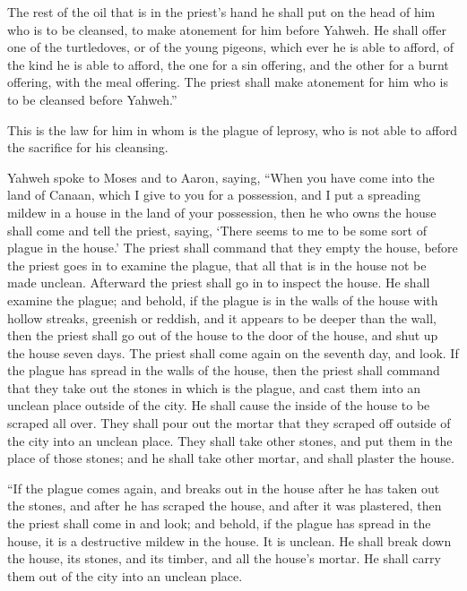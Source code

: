 {The rest of the oil that is in the priest’s hand he shall put on the head of him who is to be cleansed, to make atonement for him before Yahweh.
He shall offer one of the turtledoves, or of the young pigeons, which ever he is able to afford,
of the kind he is able to afford, the one for a sin offering, and the other for a burnt offering, with the meal offering. The priest shall make atonement for him who is to be cleansed before Yahweh.”
\par }{\PP {}This is the law for him in whom is the plague of leprosy, who is not able to afford the sacrifice for his cleansing.
\par }{\PP {}Yahweh spoke to Moses and to Aaron, saying,
“When you have come into the land of Canaan, which I give to you for a possession, and I put a spreading mildew in a house in the land of your possession,
then he who owns the house shall come and tell the priest, saying, ‘There seems to me to be some sort of plague in the house.’
The priest shall command that they empty the house, before the priest goes in to examine the plague, that all that is in the house not be made unclean. Afterward the priest shall go in to inspect the house.
He shall examine the plague; and behold, if the plague is in the walls of the house with hollow streaks, greenish or reddish, and it appears to be deeper than the wall,
then the priest shall go out of the house to the door of the house, and shut up the house seven days.
The priest shall come again on the seventh day, and look. If the plague has spread in the walls of the house,
then the priest shall command that they take out the stones in which is the plague, and cast them into an unclean place outside of the city.
He shall cause the inside of the house to be scraped all over. They shall pour out the mortar that they scraped off outside of the city into an unclean place.
They shall take other stones, and put them in the place of those stones; and he shall take other mortar, and shall plaster the house.
\par }{\PP {}“If the plague comes again, and breaks out in the house after he has taken out the stones, and after he has scraped the house, and after it was plastered,
then the priest shall come in and look; and behold, if the plague has spread in the house, it is a destructive mildew in the house. It is unclean.
He shall break down the house, its stones, and its timber, and all the house’s mortar. He shall carry them out of the city into an unclean place.
}
